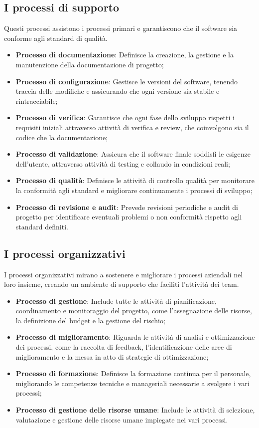 \subsection{I processi di supporto}
Questi processi assistono i processi primari e garantiscono che il software sia conforme agli standard di qualità.
\begin{itemize}
    \item \textbf{Processo di documentazione}: Definisce la creazione, la gestione e la manutenzione della documentazione di progetto;
    \item \textbf{Processo di configurazione}: Gestisce le versioni del software, tenendo traccia delle modifiche e assicurando che ogni versione sia stabile e rintracciabile;
    \item \textbf{Processo di verifica}: Garantisce che ogni fase dello sviluppo rispetti i requisiti iniziali attraverso attività di verifica e review, che coinvolgono sia il codice che la documentazione;
    \item \textbf{Processo di validazione}: Assicura che il software finale soddisfi le esigenze dell'utente, attraverso attività di testing e collaudo in condizioni reali;
    \item \textbf{Processo di qualità}: Definisce le attività di controllo qualità per monitorare la conformità agli standard e migliorare continuamente i processi di sviluppo;
    \item \textbf{Processo di revisione e audit}: Prevede revisioni periodiche e audit di progetto per identificare eventuali problemi o non conformità rispetto agli standard definiti.
\end{itemize}

\subsection{I processi organizzativi}
I processi organizzativi mirano a sostenere e migliorare i processi aziendali nel loro insieme, creando un ambiente di supporto che faciliti l'attività dei team.
\begin{itemize}
    \item \textbf{Processo di gestione}: Include tutte le attività di pianificazione, coordinamento e monitoraggio del progetto, come l'assegnazione delle risorse, la definizione del budget e la gestione del rischio;
    \item \textbf{Processo di miglioramento}: Riguarda le attività di analisi e ottimizzazione dei processi, come la raccolta di feedback, l'identificazione delle aree di miglioramento e la messa in atto di strategie di ottimizzazione;
    \item \textbf{Processo di formazione}: Definisce la formazione continua per il personale, migliorando le competenze tecniche e manageriali necessarie a svolgere i vari processi;
    \item \textbf{Processo di gestione delle risorse umane}: Include le attività di selezione, valutazione e gestione delle risorse umane impiegate nei vari processi.
\end{itemize}
